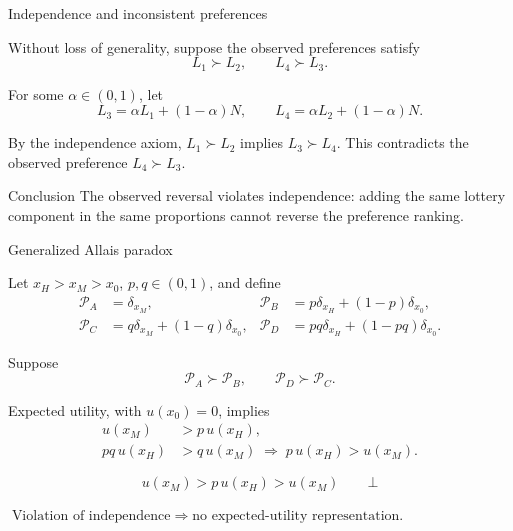 \documentclass[12pt]{beamer}
\begin{document}
\begin{frame}{Independence and inconsistent preferences}
\small

Without loss of generality, suppose the observed preferences satisfy
\[
L_1\succ L_2,\qquad L_4\succ L_3.
\]

For some \(\alpha\in(0,1)\), let
\[
L_3=\alpha L_1+(1-\alpha)N,\qquad
L_4=\alpha L_2+(1-\alpha)N.
\]

By the independence axiom, \(L_1\succ L_2\) implies \(L_3\succ L_4\). This contradicts the observed preference \(L_4\succ L_3\).

\begin{alertblock}{Conclusion}
The observed reversal violates independence: adding the same lottery component in the same proportions cannot reverse the preference ranking.
\end{alertblock}

\end{frame}

\begin{frame}{Generalized Allais paradox}
\small

Let $x_H>x_M>x_0$, $p,q\in(0,1)$, and define
\[
\begin{aligned}
\mathcal{P}_A&=\delta_{x_M},&
\mathcal{P}_B&=p\delta_{x_H}+(1-p)\delta_{x_0},\\
\mathcal{P}_C&=q\delta_{x_M}+(1-q)\delta_{x_0},&
\mathcal{P}_D&=pq\delta_{x_H}+(1-pq)\delta_{x_0}.
\end{aligned}
\]

Suppose
\[
\mathcal{P}_A\succ\mathcal{P}_B,
\qquad
\mathcal{P}_D\succ\mathcal{P}_C.
\]

Expected utility, with $u(x_0)=0$, implies
\[
\begin{aligned}
u(x_M)&>p\,u(x_H),\\
pq\,u(x_H)&>q\,u(x_M)
\;\Longrightarrow\;
p\,u(x_H)>u(x_M).
\end{aligned}
\]

\[
\boxed{u(x_M)>p\,u(x_H)>u(x_M)}
\qquad\bot
\]

\begin{alertblock}{}
$\text{Violation of independence} \;\Longrightarrow\;
\text{no expected-utility representation.}$
\end{alertblock}
\end{frame}
\end{document}
